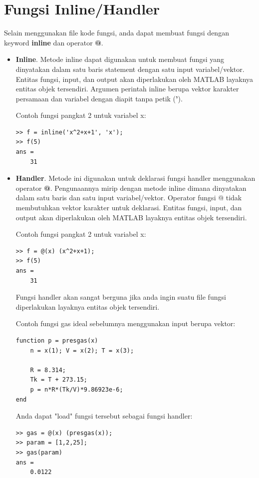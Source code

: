 \documentclass[12pt]{book}
\begin{document}
	\section{Fungsi Inline/Handler}
	
	Selain menggunakan file kode fungsi, anda dapat membuat fungsi dengan keyword \textbf{inline} dan operator \textbf{@}.
	
	\begin{itemize}
		\item \textbf{Inline}. Metode inline dapat digunakan untuk membuat fungsi yang dinyatakan dalam satu baris statement dengan satu input variabel/vektor.
		Entitas fungsi, input, dan output akan diperlakukan oleh MATLAB layaknya entitas objek tersendiri.
		Argumen perintah inline berupa vektor karakter persamaan dan variabel dengan diapit tanpa petik (\textbf{'}).
		
		Contoh fungsi pangkat 2 untuk variabel x:
		\begin{verbatim}
>> f = inline('x^2+x+1', 'x');
>> f(5)
ans =
    31
		\end{verbatim}
	
		\item \textbf{Handler}. Metode ini digunakan untuk deklarasi fungsi handler menggunakan operator \textbf{@}.
		Pengunaannya mirip dengan metode inline dimana dinyatakan dalam satu baris dan satu input variabel/vektor.
		Operator fungsi @ tidak membutuhkan vektor karakter untuk deklarasi.
		Entitas fungsi, input, dan output akan diperlakukan oleh MATLAB layaknya entitas objek tersendiri.
		
		\newpage
		Contoh fungsi pangkat 2 untuk variabel x:
		\begin{verbatim}
>> f = @(x) (x^2+x+1);
>> f(5)
ans =
    31
		\end{verbatim}

		Fungsi handler akan sangat berguna jika anda ingin suatu file fungsi diperlakukan layaknya entitas objek tersendiri.
		
		Contoh fungsi gas ideal sebelumnya menggunakan input berupa vektor:
		\begin{verbatim}
function p = presgas(x)
	n = x(1); V = x(2); T = x(3); 
	
	R = 8.314;
	Tk = T + 273.15; 
	p = n*R*(Tk/V)*9.86923e-6;
end
		\end{verbatim}
	
		Anda dapat "load" fungsi tersebut sebagai fungsi handler:
		\begin{verbatim}
>> gas = @(x) (presgas(x));
>> param = [1,2,25];
>> gas(param)
ans = 
    0.0122
		\end{verbatim}
	\end{itemize}
\end{document}
